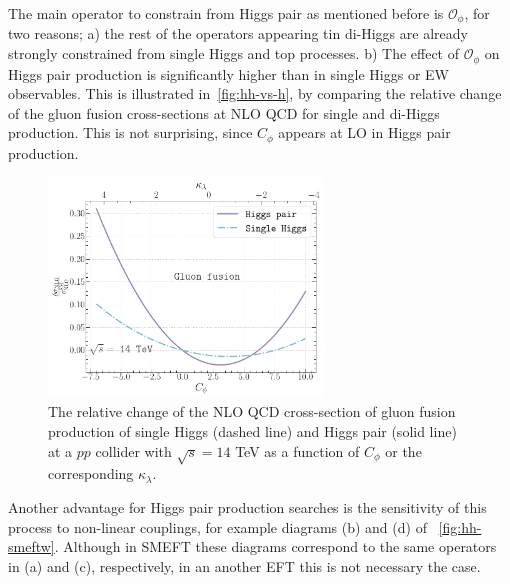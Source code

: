 The main operator to constrain from Higgs pair as mentioned before is $\mathcal{O}_{\phi}$, for two reasons; a) the rest of the operators appearing tin di-Higgs are already strongly constrained from single Higgs and top processes. b) The effect of $\mathcal{O}_{\phi}$ on Higgs pair production is significantly higher than in single Higgs or EW observables. This is illustrated in~\autoref{fig:hh-vs-h}, by comparing the relative change of the gluon fusion cross-sections at NLO QCD for single and di-Higgs production. This is not surprising, since $C_\phi$ appears at LO in Higgs pair production.
\begin{figure}[h!]
	\begin{center}
		\includegraphics[width=0.65\textwidth]{figures/trilinear_single_vs_double}
		\caption{ The relative change of the NLO QCD cross-section of gluon fusion production of single Higgs (dashed line) and Higgs pair (solid line) at a $pp$ collider with $\sqrt{s}=14$ TeV as a function of $C_\phi$ or the corresponding $\kappa_\lambda$. \label{fig:hh-vs-h} }
	\end{center}
\end{figure}
Another advantage for Higgs pair production searches is the sensitivity of this process to non-linear couplings, for example diagrams (b) and (d) of ~\autoref{fig:hh-smeftw}. Although in SMEFT these diagrams correspond to the same operators in (a) and (c), respectively, in an another EFT this is not necessary the case.
